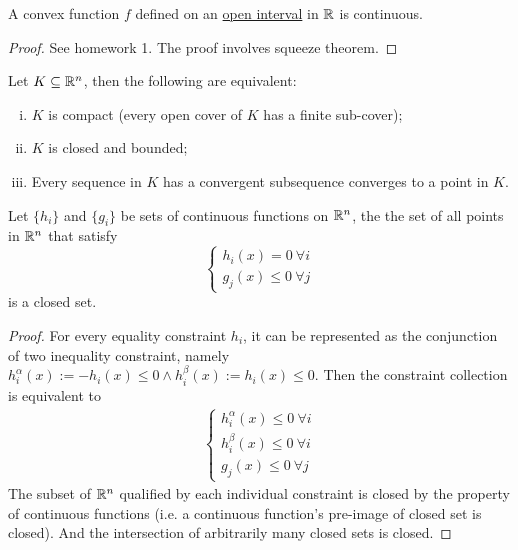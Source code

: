 \documentclass{article}
\begin{document}
    \begin{proposition}
    	A convex function $f$ defined on an \ul{open interval} in $\mathbb{R}$ is continuous.
    \end{proposition}
    
    \begin{proof}
    	See homework 1. The proof involves squeeze theorem.
    \end{proof}
    
    \begin{theorem}
    	Let $K \subseteq \mathbb{R}^n$, then the following are equivalent:
    	\begin{enumerate}[(i)]
    		\item $K$ is compact (every open cover of $K$ has a finite sub-cover);
    		\item $K$ is closed and bounded;
    		\item Every sequence in $K$ has a convergent subsequence converges to a point in $K$.
    	\end{enumerate}
    \end{theorem}
    
	\begin{proposition}
		Let $\{h_i\}$ and $\{g_i\}$ be sets of continuous functions on $\mathbb{R}^n$, the the set of all points in $\mathbb{R}^n$ that satisfy
		\begin{equation}
			\begin{cases}
				h_i(x) = 0\ \forall i\\
				g_j(x) \leq 0\ \forall j
			\end{cases}
		\end{equation}
		is a closed set.
	\end{proposition}
	
	\begin{proof}
		For every equality constraint $h_i$, it can be represented as the conjunction of two inequality constraint, namely $h_i^\alpha (x) := -h_i(x) \leq 0 \land h_i^\beta (x) := h_i(x) \leq 0$. Then the constraint collection is equivalent to
		\begin{align}
			\begin{cases}
				h_i^\alpha (x) \leq 0\ \forall i \\
				h_i^\beta (x) \leq 0\ \forall i \\
				g_j(x) \leq 0\ \forall j
			\end{cases}
		\end{align}
		The subset of $\mathbb{R}^n$ qualified by each individual constraint is closed by the property of continuous functions (i.e. a continuous function's pre-image of closed set is closed). And the intersection of arbitrarily many closed sets is closed.
	\end{proof}
	
\end{document}
